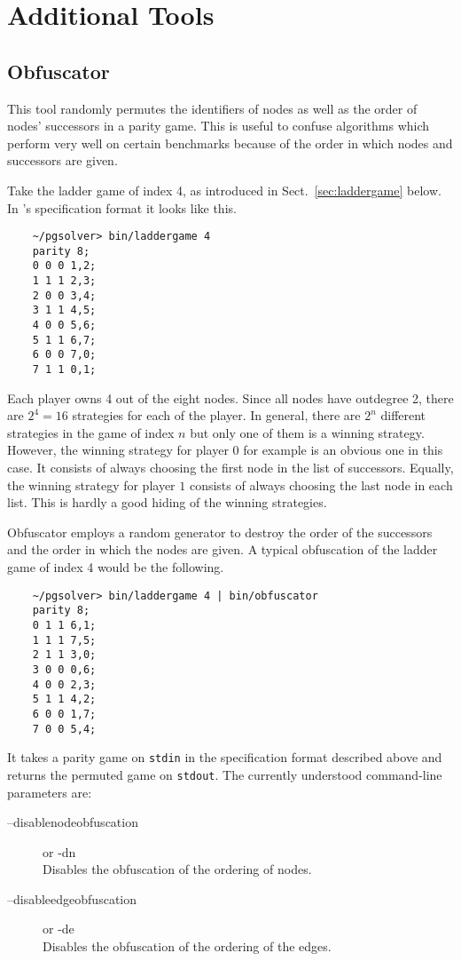 \section{Additional Tools}
\label{sec:tools}

\subsection{Obfuscator}

This tool randomly permutes the identifiers of nodes as well as the order
of nodes' successors in a parity game. This is useful to confuse algorithms
which perform very well on certain benchmarks because of the order in which
nodes and successors are given.

\begin{example}
Take the ladder game of index 4, as introduced in Sect.~\ref{sec:laddergame}
below. In \pgsolver's specification format it looks like this.
\begin{verbatim}
    ~/pgsolver> bin/laddergame 4
    parity 8;
    0 0 0 1,2;
    1 1 1 2,3;
    2 0 0 3,4;
    3 1 1 4,5;
    4 0 0 5,6;
    5 1 1 6,7;
    6 0 0 7,0;
    7 1 1 0,1;
\end{verbatim}
Each player owns 4 out of the eight nodes. Since all nodes have outdegree 2, there
are $2^4 = 16$ strategies for each of the player. In general, there are $2^n$
different strategies in the game of index $n$ but only one of them is
a winning strategy. However, the winning strategy for player $0$ for example is
an obvious one in this case. It consists of always choosing the first node in the
list of successors. Equally, the winning strategy for player $1$ consists of always
choosing the last node in each list. This is hardly a good hiding of the winning
strategies.

Obfuscator employs a random generator to destroy the order of the successors and
the order in which the nodes are given. A typical obfuscation of the ladder game of
index 4 would be the following.
\begin{verbatim}
    ~/pgsolver> bin/laddergame 4 | bin/obfuscator
    parity 8;
    0 1 1 6,1;
    1 1 1 7,5;
    2 1 1 3,0;
    3 0 0 0,6;
    4 0 0 2,3;
    5 1 1 4,2;
    6 0 0 1,7;
    7 0 0 5,4;
\end{verbatim}
\end{example}

It takes a parity game on \texttt{stdin} in the specification format described above
and returns the permuted game on \texttt{stdout}. The currently understood command-line
parameters are:
\begin{description}
\item[{\ttfamily --disablenodeobfuscation}] \enspace or {\ttfamily -dn} \\
	Disables the obfuscation of the ordering of nodes.

\item[{\ttfamily --disableedgeobfuscation}] \enspace or {\ttfamily -de} \\
    Disables the obfuscation of the ordering of the edges.
\end{description}



